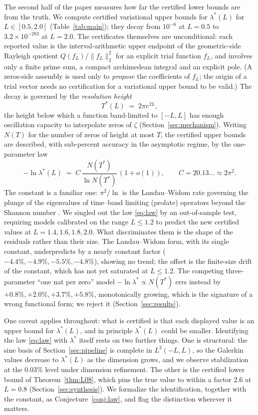 ﻿\documentclass[11pt]{article}
\newcommand{\lmin}{\lambda^{*}}
\newcommand{\Tstar}{T^{*}}
\begin{document}
The second half of the paper measures how far the certified lower
bounds are from the truth.  We compute certified variational upper
bounds for $\lmin(L)$ for $L\in[0.5,2.0]$ (Table~\ref{tab:main}); they
decay from $10^{-6}$ at $L=0.5$ to $3.2\times10^{-283}$ at $L=2.0$.
The certificates themselves are unconditional: each reported value is
the interval-arithmetic upper endpoint of the geometric-side Rayleigh
quotient $Q(f_L)/\|f_L\|_2^2$ for an explicit trial function $f_L$,
and involves only a finite prime sum, a compact archimedean integral
and an explicit pole.  (A zeros-side assembly is used only to
\emph{propose} the coefficients of $f_L$; the origin of a trial
vector needs no certification for a variational upper bound to be
valid.)  The decay is governed by the \emph{resolution
height}
\[
  \Tstar(L)\;=\;2\pi e^{2L},
\]
the height below which a function band-limited to $[-L,L]$ has enough
oscillation capacity to interpolate zeros of $\zeta$
(Section~\ref{sec:mechanism}).  Writing $N(T)$ for the number of zeros
of height at most $T$, the certified upper bounds are described, with
sub-percent accuracy in the asymptotic regime, by the one-parameter law
\begin{equation}\label{eq:law}
  -\ln\lmin(L)\;=\;C\,\frac{N(\Tstar)}{\ln N(\Tstar)}\,(1+o(1)),
  \qquad C = 20.13\ldots \approx 2\pi^2 .
\end{equation}
The constant is a familiar one: $\pi^2/\ln$ is the Landau--Widom rate
governing the plunge of the eigenvalues of time--band limiting
(prolate) operators beyond the Shannon number
\cite{LandauWidom1980,SlepianPollak1961}.  We singled out the law
\eqref{eq:law} by an out-of-sample test, requiring models calibrated
on the range $L\le1.2$ to predict the new certified values at
$L=1.4,1.6,1.8,2.0$.  What discriminates them is the shape of the
residuals rather than their size.  The Landau--Widom form, with its
single constant, underpredicts by a nearly constant factor
($-4.4\%,-4.9\%,-5.5\%,-4.8\%$), showing no trend; the offset is the
finite-size drift of the constant, which has not yet saturated at
$L\le1.2$.  The competing three-parameter ``one nat per zero'' model
$-\ln\lmin\propto N(\Tstar)$ errs instead by
$+0.8\%,+2.0\%,+3.7\%,+5.8\%$, monotonically growing, which is the
signature of a wrong functional form; we reject it
(Section~\ref{sec:results}).

One caveat applies throughout: what is certified is that each
displayed value is an upper bound for $\lmin(L)$, and in principle
$\lmin(L)$ could be smaller.  Identifying the law \eqref{eq:law} with
$\lmin$ itself rests on two further things.  One is structural: the
sine basis of Section~\ref{sec:pipeline} is complete in $L^2(-L,L)$,
so the Galerkin values decrease to $\lmin(L)$ as the dimension grows,
and we observe stabilization at the $0.03\%$ level under dimension
refinement.  The other is the certified lower bound of
Theorem~\ref{thm:L08}, which pins the true value to within a factor
$2.6$ at $L=0.8$ (Section~\ref{sec:synthesis}).  We formalize the
identification, together with the constant, as
Conjecture~\ref{conj:law}, and flag the distinction wherever it
matters.
\end{document}
